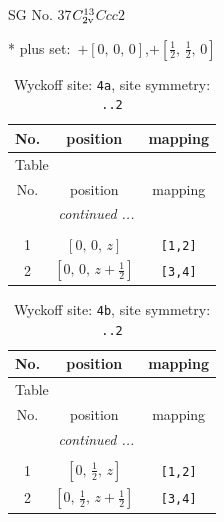 \documentclass[fleqn,8pt]{jsarticle}
\begin{document}
\setcounter{MaxMatrixCols}{32}

\renewcommand{\tablename}{Table~}
\renewcommand{\figurename}{Figure~}
\begin{center}
\LARGE
SG No. 37\quad$C_{\rm 2v}^{13}$\quad$Ccc2$\quad[ orthorhombic ]
\end{center}
* plus set:\,\,\,$+\left[ 0,\, 0,\, 0 \right]$,\quad $+\left[ \frac{1}{2},\, \frac{1}{2},\, 0 \right]$
\renewcommand{\arraystretch}{1.2}
\begin{longtable}{ccc}
\caption{Wyckoff site: {\tt 4a}, site symmetry: {\tt ..2}}
 \\
 \hline \hline
No. & position & mapping \\ \hline \endfirsthead

\multicolumn{2}{l}{\tablename\ \thetable{}} \\
 \hline \hline
No. & position & mapping \\ \hline \endhead

 \hline \hline
\multicolumn{2}{r}{\footnotesize\it continued ...} \\ \endfoot

 \hline \hline
\multicolumn{2}{r}{} \\ \endlastfoot

1 & $\left[ 0,\, 0,\, z \right]$ & {\tt [1,2]} \\ \hline
2 & $\left[ 0,\, 0,\, z + \frac{1}{2} \right]$ & {\tt [3,4]} \\
\end{longtable}
\renewcommand{\arraystretch}{1.2}
\begin{longtable}{ccc}
\caption{Wyckoff site: {\tt 4b}, site symmetry: {\tt ..2}}
 \\
 \hline \hline
No. & position & mapping \\ \hline \endfirsthead

\multicolumn{2}{l}{\tablename\ \thetable{}} \\
 \hline \hline
No. & position & mapping \\ \hline \endhead

 \hline \hline
\multicolumn{2}{r}{\footnotesize\it continued ...} \\ \endfoot

 \hline \hline
\multicolumn{2}{r}{} \\ \endlastfoot

1 & $\left[ 0,\, \frac{1}{2},\, z \right]$ & {\tt [1,2]} \\ \hline
2 & $\left[ 0,\, \frac{1}{2},\, z + \frac{1}{2} \right]$ & {\tt [3,4]} \\
\end{longtable}
\end{document}
